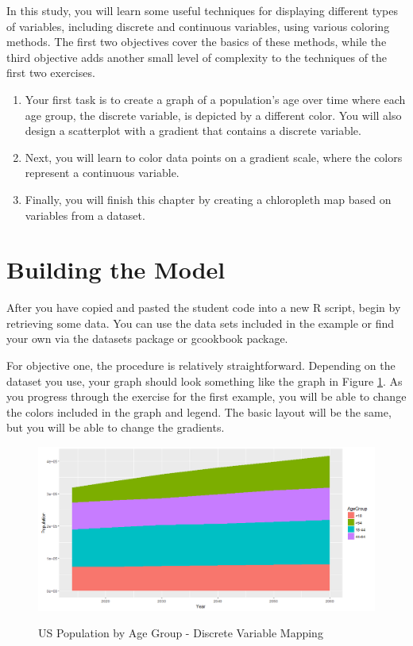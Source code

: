 In this study, you will learn some useful techniques for displaying different types of variables, including discrete and continuous variables, using various coloring methods.
The first two objectives cover the basics of these methods, while the third objective adds another small level of complexity to the techniques of the first two exercises.

\begin{enumerate}
\item Your first task is to create a graph of a population's age over time where each age group, the discrete variable, is depicted by a different color. You will also design a scatterplot with a gradient that contains a discrete variable.

\item Next, you will learn to color data points on a gradient scale, where the colors represent a continuous variable.

\item Finally, you will finish this chapter by creating a chloropleth map based on variables from a dataset.
\end{enumerate}

\section{Building the Model}

After you have copied and pasted the student code into a new R script, begin by retrieving some data.
You can use the data sets included in the example or find your own via the datasets package or gcookbook package.\medskip

For objective one, the procedure is relatively straightforward.
Depending on the dataset you use, your graph should look something like the graph in Figure \ref{fig:popagebase}.
As you progress through the exercise for the first example, you will be able to change the colors included in the graph and legend.
The basic layout will be the same, but you will be able to change the gradients.

\begin{figure}[htbp!]
   \centering
      \caption{US Population by Age Group - Discrete Variable Mapping}
   \includegraphics[width=.5\textwidth]{pictures/ggplot2/popagebase.png} 
   \label{fig:popagebase}
\end{figure} 

